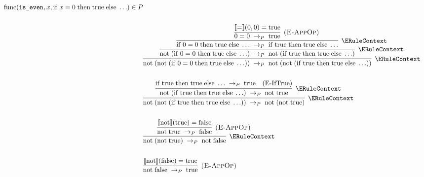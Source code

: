 \begin{align*}
{{{      } {
        \Func{\code{is\_even}}{x}{\If{x = 0}{\true}{\dots}} \in P
      }
    }
  } \\\\
  & \infer[\ERuleContext] {
    \Reduce{P}
        {\App{\mathrm{not}}{\paren{\App{\mathrm{not}}{\paren
          {\If{0 = 0}{\true}{\dots}}
        }}}}
        {\App{\mathrm{not}}{\paren{\App{\mathrm{not}}{\paren
          {\If{\true}{\true}{\dots}}
        }}}}
  } {
    \infer[\ERuleContext] {
      \Reduce{P}
        {\App{\mathrm{not}}{\paren{\If{0 = 0}{\true}{\dots}}}}
        {\App{\mathrm{not}}{\paren{\If{\true}{\true}{\dots}}}}
    } {
      \infer[\ERuleContext] {
        \Reduce{P}
          {\If{0 = 0}{\true}{\dots}}
          {\If{\true}{\true}{\dots}}
      } {
        \infer[\ERuleAppOp] {
          \Reduce{P}{0 = 0}{\true}
        } {
          \sem{=}\paren{0, 0} = \true
        }
      }
    }
  } \\\\
  & \infer[\ERuleContext] {
    \Reduce{P}
      {\App{\mathrm{not}}{\paren{\App{\mathrm{not}}{\paren
          {\If{\true}{\true}{\dots}}
      }}}}
      {\App{\mathrm{not}}{\paren{\App{\mathrm{not}}{\true}}}}
  } {
    \infer[\ERuleContext] {
      \Reduce{P}
        {\App{\mathrm{not}}{\paren{\If{\true}{\true}{\dots}}}}
        {\App{\mathrm{not}}{\true}}
    } {
      \Reduce{P}
        {\If{\true}{\true}{\dots}}
        {\true} \quad \ERuleIfTrue
    }
  } \\\\
  & \infer[\ERuleContext] {
    \Reduce{P}
      {\App{\mathrm{not}}{\paren{\App{\mathrm{not}}{\true}}}}
      {\App{\mathrm{not}}{\false}}
  } {
    \infer[\ERuleAppOp] {
      \Reduce{P}
        {\App{\mathrm{not}}{\true}}
        {\false}
    } {
      \sem{\mathrm{not}}\paren{\true} = \false
    }
  } \\\\
  & \infer[\ERuleAppOp] {
    \Reduce{P}{\App{\mathrm{not}}{\false}}{\true}
  } {
    \sem{\mathrm{not}}\paren{\false} = \true
  }
\end{align*}

\fi
